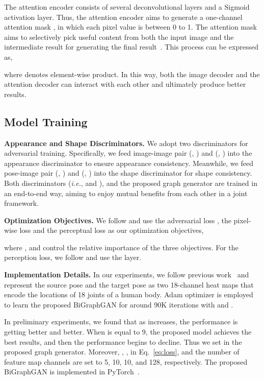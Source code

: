 \documentclass{bmvc2k}
\begin{document}
The attention encoder consists of several deconvolutional layers and a Sigmoid activation layer. Thus, the attention encoder aims to generate a one-channel attention mask , in which each pixel value is between 0 to 1.
The attention mask  aims to selectively pick useful content from both the input image  and the intermediate result  for generating the final result~. This process can be expressed as,

where  denotes element-wise product.
In this way, both the image decoder and the attention decoder can interact with each other and ultimately produce better results.

\subsection{Model Training}
\noindent \textbf{Appearance and Shape Discriminators.} 
We adopt two discriminators for adversarial training.
Specifically, we feed image-image pair (, ) and (, ) into the appearance discriminator  to ensure appearance consistency.
Meanwhile, we feed pose-image pair (, ) and (, ) into the shape discriminator  for shape consistency.
Both discriminators (\emph{i.e.},  and ), and the proposed graph generator  are trained in an end-to-end way, aiming to enjoy mutual benefits from each other in a joint framework.

\noindent \textbf{Optimization Objectives.} We follow \cite{zhu2019progressive,tang2020xinggan} and use the adversarial loss , the pixel-wise  loss  and the perceptual loss  as our optimization objectives,

where ,  and  control the relative importance of the three objectives.
For the perception loss, we follow \cite{zhu2019progressive,tang2020xinggan} and use the  layer.

\noindent \textbf{Implementation Details.}
In our experiments, we follow previous work~\cite{zhu2019progressive,tang2020xinggan} and represent the source pose  and the target pose  as two 18-channel heat maps that encode the locations of 18 joints of a human body.
Adam optimizer \cite{kingma2014adam} is employed to learn the proposed BiGraphGAN for around 90K iterations with  and .

In preliminary experiments, we found that as  increases, the performance is getting better and better. When  is equal to 9, the proposed model achieves the best results, and then the performance begins to decline. Thus we set  in the proposed graph generator.
Moreover, , ,  in Eq.~\eqref{eq:loss}, and the number of feature map channels  are set to 5, 10, 10, and 128, respectively.
The proposed BiGraphGAN is implemented in PyTorch~\cite{paszke2019pytorch}. 
\end{document}
